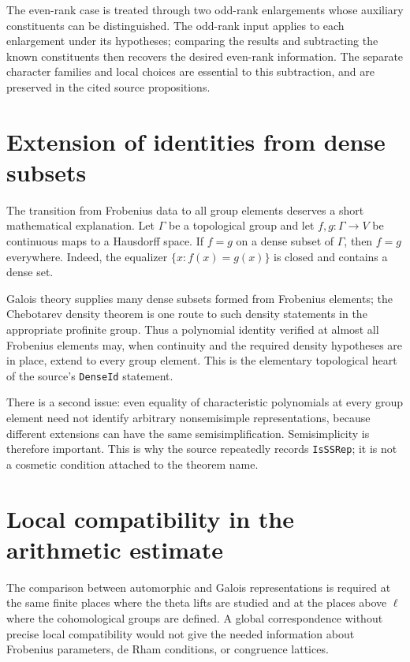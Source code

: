 \documentclass[11pt,openany,oneside]{scrbook}
\theoremstyle{definition}
\theoremstyle{remark}
\begin{document}
The even-rank case is treated through two odd-rank enlargements whose auxiliary constituents can be distinguished. The odd-rank input applies to each enlargement under its hypotheses; comparing the results and subtracting the known constituents then recovers the desired even-rank information. The separate character families and local choices are essential to this subtraction, and are preserved in the cited source propositions.

\section{Extension of identities from dense subsets}

The transition from Frobenius data to all group elements deserves a short mathematical explanation. Let $\Gamma$ be a topological group and let $f,g:\Gamma\to V$ be continuous maps to a Hausdorff space. If $f=g$ on a dense subset of $\Gamma$, then $f=g$ everywhere. Indeed, the equalizer $\{x:f(x)=g(x)\}$ is closed and contains a dense set.

Galois theory supplies many dense subsets formed from Frobenius elements; the Chebotarev density theorem is one route to such density statements in the appropriate profinite group. Thus a polynomial identity verified at almost all Frobenius elements may, when continuity and the required density hypotheses are in place, extend to every group element. This is the elementary topological heart of the source's \texttt{DenseId} statement.

There is a second issue: even equality of characteristic polynomials at every group element need not identify arbitrary nonsemisimple representations, because different extensions can have the same semisimplification. Semisimplicity is therefore important. This is why the source repeatedly records \texttt{IsSSRep}; it is not a cosmetic condition attached to the theorem name.

\section{Local compatibility in the arithmetic estimate}
The comparison between automorphic and Galois representations is required at the same finite places where the theta lifts are studied and at the places above $\ell$ where the cohomological groups are defined. A global correspondence without precise local compatibility would not give the needed information about Frobenius parameters, de Rham conditions, or congruence lattices.
\end{document}
